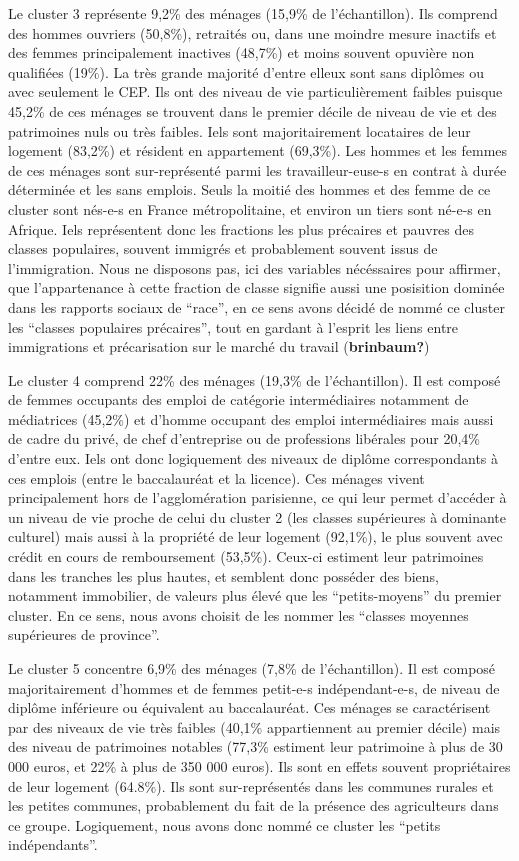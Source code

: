 \documentclass[
  12pt,
]{book}
\begin{document}
Le cluster 3 représente 9,2\% des ménages (15,9\% de l'échantillon). Ils
comprend des hommes ouvriers (50,8\%), retraités ou, dans une moindre
mesure inactifs et des femmes principalement inactives (48,7\%) et moins
souvent opuvière non qualifiées (19\%). La très grande majorité d'entre
elleux sont sans diplômes ou avec seulement le CEP. Ils ont des niveau
de vie particulièrement faibles puisque 45,2\% de ces ménages se
trouvent dans le premier décile de niveau de vie et des patrimoines nuls
ou très faibles. Iels sont majoritairement locataires de leur logement
(83,2\%) et résident en appartement (69,3\%). Les hommes et les femmes
de ces ménages sont sur-représenté parmi les travailleur-euse-s en
contrat à durée déterminée et les sans emplois. Seuls la moitié des
hommes et des femme de ce cluster sont nés-e-s en France métropolitaine,
et environ un tiers sont né-e-s en Afrique. Iels représentent donc les
fractions les plus précaires et pauvres des classes populaires, souvent
immigrés et probablement souvent issus de l'immigration. Nous ne
disposons pas, ici des variables nécéssaires pour affirmer, que
l'appartenance à cette fraction de classe signifie aussi une posisition
dominée dans les rapports sociaux de ``race'', en ce sens avons décidé
de nommé ce cluster les ``classes populaires précaires'', tout en
gardant à l'esprit les liens entre immigrations et précarisation sur le
marché du travail (\textbf{brinbaum?})

Le cluster 4 comprend 22\% des ménages (19,3\% de l'échantillon). Il est
composé de femmes occupants des emploi de catégorie intermédiaires
notamment de médiatrices (45,2\%) et d'homme occupant des emploi
intermédiaires mais aussi de cadre du privé, de chef d'entreprise ou de
professions libérales pour 20,4\% d'entre eux. Iels ont donc logiquement
des niveaux de diplôme correspondants à ces emplois (entre le
baccalauréat et la licence). Ces ménages vivent principalement hors de
l'agglomération parisienne, ce qui leur permet d'accéder à un niveau de
vie proche de celui du cluster 2 (les classes supérieures à dominante
culturel) mais aussi à la propriété de leur logement (92,1\%), le plus
souvent avec crédit en cours de remboursement (53,5\%). Ceux-ci estiment
leur patrimoines dans les tranches les plus hautes, et semblent donc
posséder des biens, notamment immobilier, de valeurs plus élevé que les
``petits-moyens'' du premier cluster. En ce sens, nous avons choisit de
les nommer les ``classes moyennes supérieures de province''.

Le cluster 5 concentre 6,9\% des ménages (7,8\% de l'échantillon). Il
est composé majoritairement d'hommes et de femmes petit-e-s
indépendant-e-s, de niveau de diplôme inférieure ou équivalent au
baccalauréat. Ces ménages se caractérisent par des niveaux de vie très
faibles (40,1\% appartiennent au premier décile) mais des niveau de
patrimoines notables (77,3\% estiment leur patrimoine à plus de 30 000
euros, et 22\% à plus de 350 000 euros). Ils sont en effets souvent
propriétaires de leur logement (64.8\%). Ils sont sur-représentés dans
les communes rurales et les petites communes, probablement du fait de la
présence des agriculteurs dans ce groupe. Logiquement, nous avons donc
nommé ce cluster les ``petits indépendants''.
\end{document}
